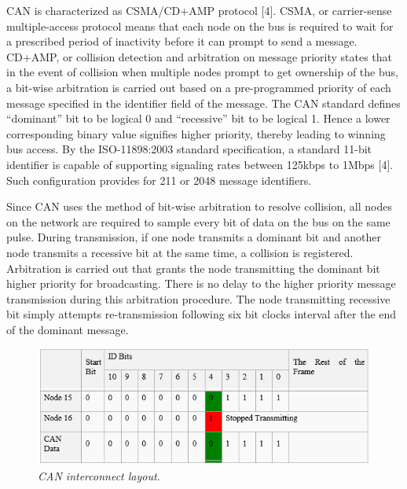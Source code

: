 \documentclass{article}
\begin{document}
\begin{flushleft}
CAN is characterized as CSMA/CD+AMP protocol [4]. CSMA, or carrier-sense multiple-access protocol means that each node on the bus is required to wait for a prescribed period of inactivity before it can prompt to send a message. CD+AMP, or collision detection and arbitration on message priority states that in the event of collision when multiple nodes prompt to get ownership of the bus, a bit-wise arbitration is carried out based on a pre-programmed priority of each message specified in the identifier field of the message. The CAN standard defines “dominant” bit to be logical 0 and “recessive” bit to be logical 1. Hence a lower corresponding binary value signifies higher priority, thereby leading to winning bus access. By the ISO-11898:2003 standard specification, a standard 11-bit identifier is capable of supporting signaling rates between 125kbps to 1Mbps [4]. Such configuration provides for 211 or 2048 message identifiers.
\end{flushleft}

\begin{flushleft}
Since CAN uses the method of bit-wise arbitration to resolve collision, all nodes on the network are required to sample every bit of data on the bus on the same pulse. During transmission, if one node transmits a dominant bit and another node transmits a recessive bit at the same time, a collision is registered. Arbitration is carried out that grants the node transmitting the dominant bit higher priority for broadcasting. There is no delay to the higher priority message transmission during this arbitration procedure. The node transmitting recessive bit simply attempts re-transmission following six bit clocks interval after the end of the dominant message. 
\end{flushleft}

\begin{figure}[!ht]
\centering 
\includegraphics[width=12cm]{fig_3.PNG}
\caption{\small \sl CAN interconnect layout.}  
\end{figure}
\end{document}
